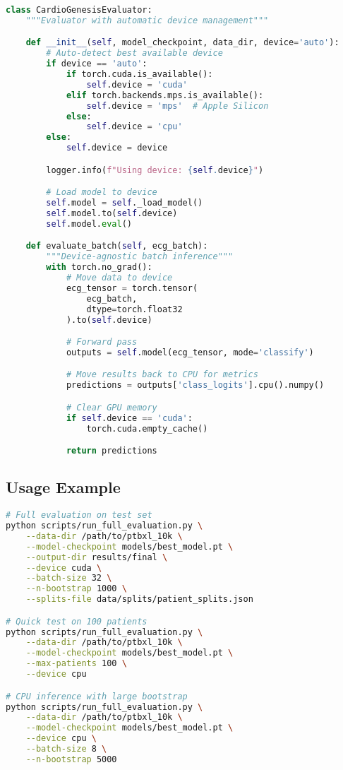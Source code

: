 \documentclass[11pt]{article}
\begin{document}
\begin{lstlisting}[language=Python, caption=Device-Agnostic Inference]
class CardioGenesisEvaluator:
    """Evaluator with automatic device management"""

    def __init__(self, model_checkpoint, data_dir, device='auto'):
        # Auto-detect best available device
        if device == 'auto':
            if torch.cuda.is_available():
                self.device = 'cuda'
            elif torch.backends.mps.is_available():
                self.device = 'mps'  # Apple Silicon
            else:
                self.device = 'cpu'
        else:
            self.device = device

        logger.info(f"Using device: {self.device}")

        # Load model to device
        self.model = self._load_model()
        self.model.to(self.device)
        self.model.eval()

    def evaluate_batch(self, ecg_batch):
        """Device-agnostic batch inference"""
        with torch.no_grad():
            # Move data to device
            ecg_tensor = torch.tensor(
                ecg_batch,
                dtype=torch.float32
            ).to(self.device)

            # Forward pass
            outputs = self.model(ecg_tensor, mode='classify')

            # Move results back to CPU for metrics
            predictions = outputs['class_logits'].cpu().numpy()

            # Clear GPU memory
            if self.device == 'cuda':
                torch.cuda.empty_cache()

            return predictions
\end{lstlisting}

\subsection{Usage Example}

\begin{lstlisting}[language=bash, caption=Running Evaluation with CLI]
# Full evaluation on test set
python scripts/run_full_evaluation.py \
    --data-dir /path/to/ptbxl_10k \
    --model-checkpoint models/best_model.pt \
    --output-dir results/final \
    --device cuda \
    --batch-size 32 \
    --n-bootstrap 1000 \
    --splits-file data/splits/patient_splits.json

# Quick test on 100 patients
python scripts/run_full_evaluation.py \
    --data-dir /path/to/ptbxl_10k \
    --model-checkpoint models/best_model.pt \
    --max-patients 100 \
    --device cpu

# CPU inference with large bootstrap
python scripts/run_full_evaluation.py \
    --data-dir /path/to/ptbxl_10k \
    --model-checkpoint models/best_model.pt \
    --device cpu \
    --batch-size 8 \
    --n-bootstrap 5000
\end{lstlisting}
\end{document}
